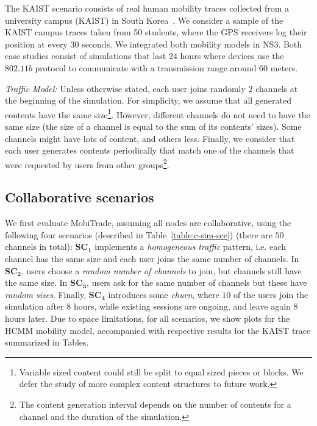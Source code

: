 The KAIST scenario consists of real human mobility traces collected from a university campus (KAIST) in South Korea~\cite{KAIST}. We consider a sample of the KAIST campus traces taken from 50 students, where the GPS receivers log their position at every $30$ seconds. We integrated both mobility models in NS3. Both case studies consist of simulations that last $24$ hours where devices use the $802.11b$ protocol to communicate with a transmission range around $60$ meters.

\emph{Traffic Model:} Unless otherwise stated, each user joins randomly $2$ channels at the beginning of the simulation. For simplicity, we assume that all generated contents have the same size\footnote{Variable sized content could still be split to equal sized pieces or blocks. We defer the study of more complex content structures to future work.}. However, different channels do not need to have the same size (the size of a channel is equal to the sum of its contents' sizes). Some channels might have lots of content, and others less. Finally, we consider that each user generates contents periodically that match one of the channels that were requested by users from other groups\footnote{The content generation interval depends on the number of contents for a channel and the duration of the simulation.}.

\subsection{Collaborative scenarios}
\label{collaborative-scenario}

We first evaluate MobiTrade, assuming all nodes are collaborative, using the following four scenarios (described in Table~\ref{table:c-sim-sce}) (there are $50$ channels in total): {$\mathbf{SC_1}$} implements a \emph{homogeneous traffic} pattern, i.e. each channel has the same size and each user joins the same number of channels. In $\mathbf{SC_2}$, users choose a \emph{random number of channels} to join, but channels still have the same size. In $\mathbf{SC_3}$, users ask for the same number of channels but these have \emph{random sizes}. Finally, $\mathbf{SC_4}$ introduces some \emph{churn}, where $10$ of the users join the simulation after $8$ hours, while existing sessions are ongoing, and leave again $8$ hours later. Due to space limitations, for all scenarios, we show plots for the HCMM mobility model, accompanied with respective results for the KAIST trace summarized in Tables.

